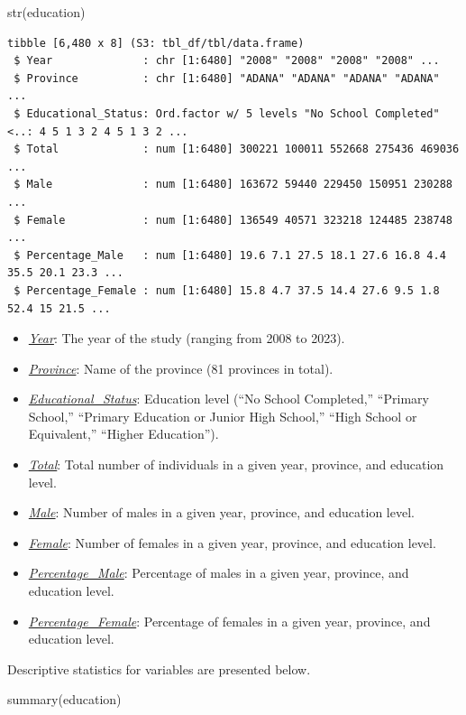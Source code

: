 \documentclass[
  11pt,
  a4paper,
  DIV=11,
  numbers=noendperiod]{scrartcl}
\newenvironment{Shaded}{\begin{snugshade}}{\end{snugshade}}
\newcommand{\FunctionTok}[1]{\textcolor[rgb]{0.28,0.35,0.67}{#1}}
\newcommand{\NormalTok}[1]{\textcolor[rgb]{0.00,0.23,0.31}{#1}}
\begin{document}
\begin{Shaded}
\begin{Highlighting}[]
 \FunctionTok{str}\NormalTok{(education)}
\end{Highlighting}
\end{Shaded}

\begin{verbatim}
tibble [6,480 x 8] (S3: tbl_df/tbl/data.frame)
 $ Year              : chr [1:6480] "2008" "2008" "2008" "2008" ...
 $ Province          : chr [1:6480] "ADANA" "ADANA" "ADANA" "ADANA" ...
 $ Educational_Status: Ord.factor w/ 5 levels "No School Completed"<..: 4 5 1 3 2 4 5 1 3 2 ...
 $ Total             : num [1:6480] 300221 100011 552668 275436 469036 ...
 $ Male              : num [1:6480] 163672 59440 229450 150951 230288 ...
 $ Female            : num [1:6480] 136549 40571 323218 124485 238748 ...
 $ Percentage_Male   : num [1:6480] 19.6 7.1 27.5 18.1 27.6 16.8 4.4 35.5 20.1 23.3 ...
 $ Percentage_Female : num [1:6480] 15.8 4.7 37.5 14.4 27.6 9.5 1.8 52.4 15 21.5 ...
\end{verbatim}

\begin{itemize}
\item
  \ul{\emph{Year}}: The year of the study (ranging from 2008 to 2023).
\item
  \ul{\emph{Province}}: Name of the province (81 provinces in total).
\item
  \ul{\emph{Educational\_Status}}: Education level (``No School
  Completed,'' ``Primary School,'' ``Primary Education or Junior High
  School,'' ``High School or Equivalent,'' ``Higher Education'').
\item
  \ul{\emph{Total}}: Total number of individuals in a given year,
  province, and education level.
\item
  \ul{\emph{Male}}: Number of males in a given year, province, and
  education level.
\item
  \ul{\emph{Female}}: Number of females in a given year, province, and
  education level.
\item
  \ul{\emph{Percentage\_Male}}: Percentage of males in a given year,
  province, and education level.
\item
  \ul{\emph{Percentage\_Female}}: Percentage of females in a given year,
  province, and education level.
\end{itemize}

Descriptive statistics for variables are presented below.

\begin{Shaded}
\begin{Highlighting}[]
 \FunctionTok{summary}\NormalTok{(education)}
\end{Highlighting}
\end{Shaded}
\end{document}
